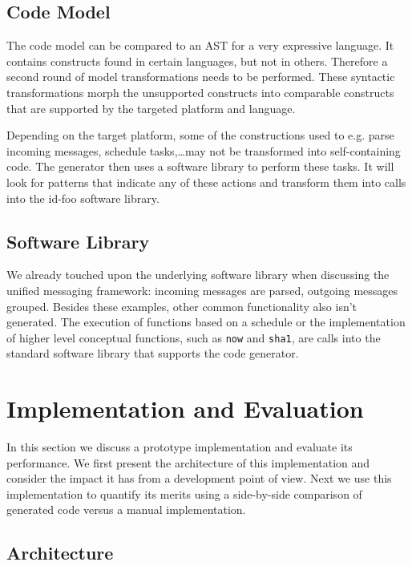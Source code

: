 \documentclass[conference]{IEEEtran}
\newcommand{\NAME}{id-foo\xspace}
\begin{document}
\subsection*{Code Model}

The code model can be compared to an AST for a very expressive language. It
contains constructs found in certain languages, but not in others. Therefore a
second round of model transformations needs to be performed. These syntactic
transformations morph the unsupported constructs into comparable constructs
that are supported by the targeted platform and language.

Depending on the target platform, some of the constructions used to e.g. parse
incoming messages, schedule tasks,\dots may not be transformed into
self-containing code. The generator then uses a software library to perform
these tasks. It will look for patterns that indicate any of these actions and
transform them into calls into the \NAME software library.

\subsection*{Software Library}

We already touched upon the underlying software library when discussing the
unified messaging framework: incoming messages are parsed, outgoing messages
grouped. Besides these examples, other common functionality also isn't
generated. The execution of functions based on a schedule or the implementation
of higher level conceptual functions, such as \texttt{now} and \texttt{sha1},
are calls into the standard software library that supports the code generator.

\section{Implementation and Evaluation}
\label{evaluation}

In this section we discuss a prototype implementation and evaluate its
performance. We first present the architecture of this implementation and
consider the impact it has from a development point of view. Next we use this
implementation to quantify its merits using a side-by-side comparison of
generated code versus a manual implementation.

\subsection*{Architecture}
\end{document}
